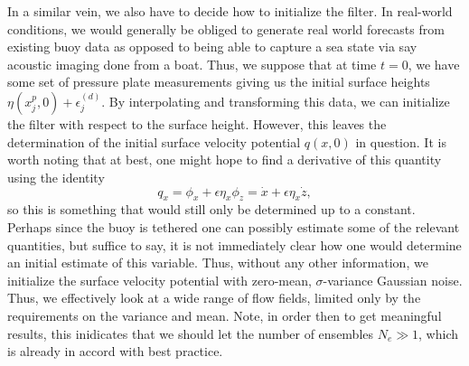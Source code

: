In a similar vein, we also have to decide how to initialize the filter.  In real-world conditions, we would generally be obliged to generate real world forecasts from existing buoy data as opposed to being able to capture a sea state via say acoustic imaging done from a boat.  Thus, we suppose that at time $t=0$, we have some set of pressure plate measurements giving us the initial surface heights $\eta(x_{j}^{p},0) + \epsilon^{(d)}_{j}$.  By interpolating and transforming this data, we can initialize the filter with respect to the surface height.  However, this leaves the determination of the initial surface velocity potential $q(x,0)$ in question.  It is worth noting that at best, one might hope to find a derivative of this quantity using the identity
\[
q_{x} = \phi_{x} + \epsilon \eta_{x}\phi_{z} = \dot{x} + \epsilon \eta_{x}\dot{z},
\]
so this is something that would still only be determined up to a constant.  Perhaps since the buoy is tethered one can possibly estimate some of the relevant quantities, but suffice to say, it is not immediately clear how one would determine an initial estimate of this variable.  Thus, without any other information, we initialize the surface velocity potential with zero-mean, $\sigma$-variance Gaussian noise.  Thus, we effectively look at a wide range of flow fields, limited only by the requirements on the variance and mean.  Note, in order then to get meaningful results, this inidicates that we should let the number of ensembles $N_{e}\gg1$, which is already in accord with best practice.  


